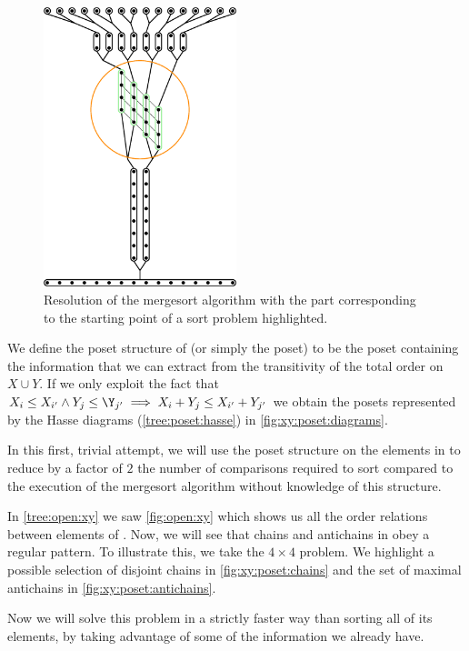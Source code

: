 \begin{figure}
\centering
\includegraphics[width=0.5\textwidth,angle=90]{fig/x+y/poset/mergexy}
\caption{Resolution of the mergesort algorithm with the part
corresponding to the starting point of a sort \XY problem highlighted.}
\label{fig:xy:poset:mergexy}
\end{figure}

We define the poset structure of \XY (or simply the \XY poset) to be the poset
containing the information that we can extract from the transitivity of the
total order on \(X \cup Y\). If we only exploit the fact that
\(X_i \le X_{i'} \land Y_j \le \Y_{j'} \implies X_i + Y_j \le X_{i'} + Y_{j'}\)
we obtain the posets represented by the Hasse diagrams (\ref{tree:poset:hasse})
in \ref{fig:xy:poset:diagrams}.

In this first, trivial attempt, we will use the poset structure on the
elements in \XY to reduce by a factor of $2$ the number of comparisons required
to sort \XY compared to the execution of the mergesort algorithm without
knowledge of this structure.

In \ref{tree:open:xy} we saw \ref{fig:open:xy} which shows us all the order
relations between elements of \XY. Now, we will see that chains and antichains
in \XY obey a regular pattern. To illustrate this, we take the $4 \times 4$
\XY problem. We highlight a possible selection of disjoint chains in
\ref{fig:xy:poset:chains} and the set of maximal antichains in
\ref{fig:xy:poset:antichains}.

Now we will solve this problem in a strictly faster way than sorting all
of its elements, by taking advantage of some of the information we already have.

